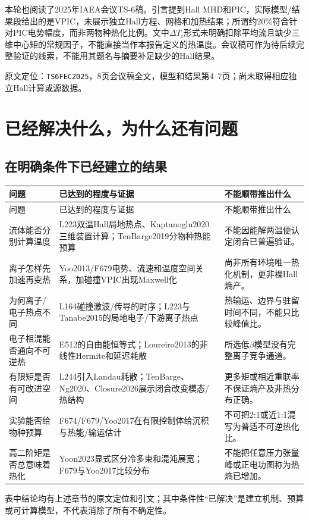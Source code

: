 \documentclass[UTF8,a4paper,11pt,openany,fontset=fandol]{ctexbook}
\newcommand{\loc}[2]{\par\noindent\textsf{原文定位：}\texttt{#1}，#2。\par}
\begin{document}
本轮也阅读了2025年IAEA会议TS-6稿。引言提到Hall MHD和PIC，实际模型/结果段给出的是VPIC，未展示独立Hall方程、网格和加热结果；所谓约20\%符合针对PIC电势幅度，而非两物种热化比例。文中$\Delta T_i$形式未明确扣除平均流且缺少三维中心矩的常规因子，不能直接当作本报告定义的热温度。会议稿可作为待后续完整验证的线索，不能用其题名与摘要补足缺少的Hall结果。\citep{TS6FEC2025}
\loc{TS6FEC2025}{8页会议稿全文，模型和结果第4--7页；尚未取得相应独立Hall计算或源数据}



\chapter{已经解决什么，为什么还有问题}

\section{在明确条件下已经建立的结果}
\begin{longtable}{P{34mm}P{62mm}P{52mm}}
\toprule 问题 & 已达到的程度与证据 & 不能顺带推出什么\\\midrule\endfirsthead
\toprule 问题 & 已达到的程度与证据 & 不能顺带推出什么\\\midrule\endhead
流体能否分别计算温度 & L223双温Hall局地热点、Kaptanoglu2020三维装置计算；TenBarge2019分物种热能预算 & 不能因能解两温便认定闭合已普遍验证。\\
离子怎样先加速再变热 & Yoo2013/F679电势、流速和温度空间关系，加碰撞VPIC出现Maxwell化 & 尚非所有环境唯一热化机制，更非裸Hall熵产。\\
为何离子/电子热点不同 & L164碰撞激波/传导的时序；L223与Tanabe2015的局地电子/下游离子热点 & 热输运、边界与驻留时间不同，不能只比较峰值比。\\
电子相混能否通向不可逆热 & E512的自由能恒等式；Loureiro2013的非线性Hermite和延迟耗散 & 所选低$\beta$模型没有完整离子竞争通道。\\
有限矩是否有可改进空间 & L244引入Landau耗散；TenBarge、Ng2020、Closure2026展示闭合改变模态/热结构 & 更多矩或相近重联率不保证熵产及非热分布正确。\\
实验能否给物种预算 & F674/F679/Yoo2017在有限控制体给沉积与热能/输运估计 & 不可把2:1或近1:1混写为普适不可逆热化比。\\
高二阶矩是否总意味着热化 & Yoon2023显式区分冷多束和混沌展宽；F679与Yoo2017比较分布 & 不能把任意压力张量峰或正电功图称为热熵已增加。\\
\bottomrule\end{longtable}
表中结论均有上述章节的原文定位和引文；其中条件性“已解决”是建立机制、预算或可计算模型，不代表消除了所有不确定性。
\end{document}
